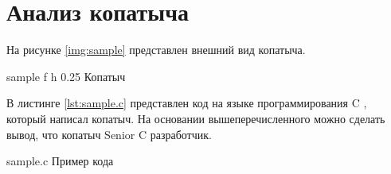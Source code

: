 \chapter{Анализ копатыча}
На рисунке \ref{img:sample} представлен внешний вид копатыча.

    {sample}
    {f}
    {h}
    {0.25\textwidth}
    {Копатыч}

В листинге \ref{lst:sample.c} представлен код на языке программирования C \cite{kandr}, который написал копатыч. На основании вышеперечисленного можно сделать вывод, что копатыч Senior C разработчик.

    {sample.c}
    {Пример кода}
